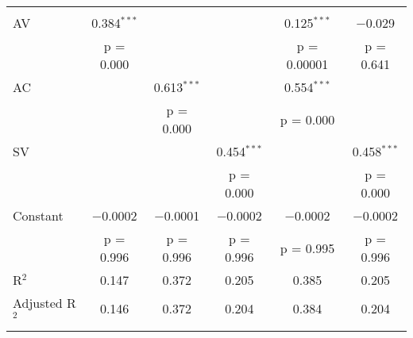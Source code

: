 
\begin{tabular}{@{\extracolsep{5pt}}lccccc} 
\\[-1.8ex]
\hline \\[-1.8ex] 
 AV & 0.384$^{***}$ &  &  & 0.125$^{***}$ & $-$0.029 \\ 
  & p = 0.000 &  &  & p = 0.00001 & p = 0.641 \\ 
 AC &  & 0.613$^{***}$ &  & 0.554$^{***}$ &  \\ 
  &  & p = 0.000 &  & p = 0.000 &  \\ 
 SV &  &  & 0.454$^{***}$ &  & 0.458$^{***}$ \\ 
  &  &  & p = 0.000 &  & p = 0.000 \\ 
 Constant & $-$0.0002 & $-$0.0001 & $-$0.0002 & $-$0.0002 & $-$0.0002 \\ 
  & p = 0.996 & p = 0.996 & p = 0.996 & p = 0.995 & p = 0.996 \\ 
R$^{2}$ & 0.147 & 0.372 & 0.205 & 0.385 & 0.205 \\ 
Adjusted R$^{2}$ & 0.146 & 0.372 & 0.204 & 0.384 & 0.204 \\ 
\hline \\[-1.8ex] 
\end{tabular} 
